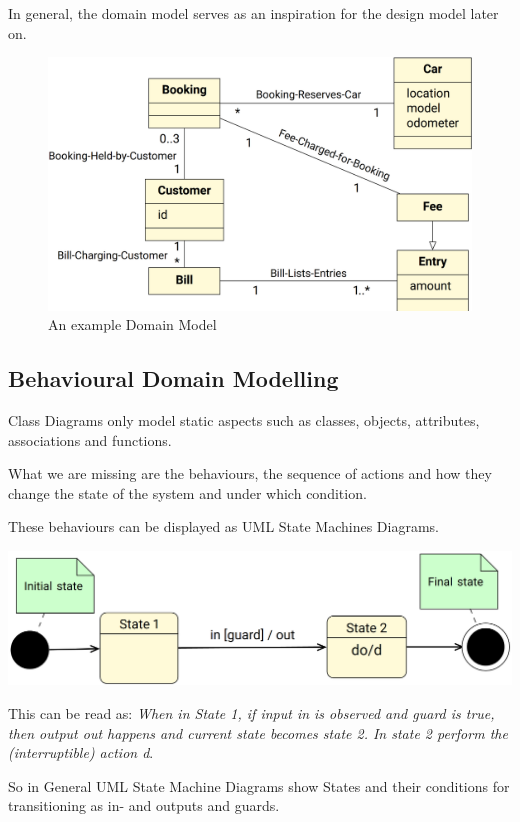 \documentclass[
../../Software_Engineering_Summary.tex,
]
{subfiles}
\begin{document}
In general, the domain model serves as an inspiration for the design model later on.
\begin{figure}
    [htp]
    \centering
    \includegraphics[scale= 0.4]{Pics/DomainModelExample.png}
    \caption{An example Domain Model}
\end{figure}

\newpage
\subsection{Behavioural Domain Modelling}
Class Diagrams only model static aspects such as classes, objects, attributes, associations and functions. 

What we are missing are the behaviours, the sequence of actions and how they change the state of the system and under which condition.

These behaviours can be displayed as UML State Machines Diagrams.

\begin{defbox}
    \begin{center}
        \includegraphics[scale=0.5]{Pics/UMLStateMachineDiagrams.png}
    \end{center}
    This can be read as: \textit{When in State 1, if input in is observed and guard is true, then output out happens and current state becomes state 2. In state 2 perform the (interruptible) action d}.

    So in General UML State Machine Diagrams show States and their conditions for transitioning as in- and outputs and guards.
\end{defbox}
\end{document}
